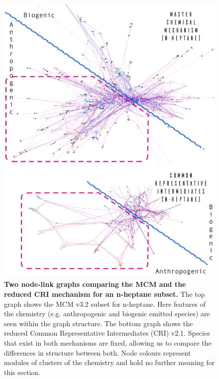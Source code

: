 \begin{figure}[H]
     \centering
         \includegraphics[width=1.1\textwidth]{fingerprintposter.pdf}
        \caption{\textbf{Two node-link graphs comparing the MCM and the reduced CRI mechanism for an n-heptane subset.} The top graph shows the MCM v3.2 subset for n-heptane. Here features of the chemistry (e.g. anthropogenic and biogenic emitted species) are seen within the graph structure. The bottom graph shows the reduced Common Representative Intermediates (CRI) v2.1. Species that exist in both mechanisms are fixed, allowing us to compare the differences in structure between both. Node colours represent modules of clusters of the chemistry and hold no further meaning for this section.  }
        \label{fig:graphc1}
\end{figure}

